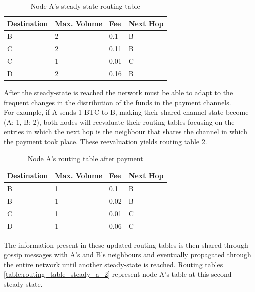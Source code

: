 \begin{table}[H]
\centering
\begin{tabular}{|l|l|l|l|}
\hline
\rowcolor[HTML]{C0C0C0} 
Destination & Max. Volume   & Fee   & Next Hop \\ \hline
B           & 2             & 0.1   & B       \\ \hline
C           & 2             & 0.11  & B       \\ \hline
C           & 1             & 0.01  & C       \\ \hline
D           & 2             & 0.16  & B       \\ \hline
\end{tabular}
\caption{Node A's steady-state routing table}
\label{table:routing_table_steady_a}
\end{table}

After the steady-state is reached the network must be able to adapt to the frequent changes in the distribution of the funds in the payment channels.\\
For example, if A sends 1 BTC to B, making their shared channel state become (A: 1, B: 2), both nodes will reevaluate their routing tables focusing on the entries in which the next hop is the neighbour that shares the channel in which the payment took place. These reevaluation yields routing table \ref{table:routing_table_payment_a}.

\begin{table}[H]
\centering
\begin{tabular}{|l|l|l|l|}
\hline
\rowcolor[HTML]{C0C0C0} 
Destination & Max. Volume   & Fee   & Next Hop \\ \hline
B           & 1             & 0.1   & B       \\ \hline
B           & 1             & 0.02  & B         \\ \hline
C           & 1             & 0.01  & C       \\ \hline
D           & 1             & 0.06  & C       \\ \hline
\end{tabular}
\caption{Node A's routing table after payment}
\label{table:routing_table_payment_a}
\end{table}

The information present in these updated routing tables is then shared through gossip messages with A's and B's neighbours and eventually propagated through the entire network until another steady-state is reached. Routing tables \ref{table:routing_table_steady_a_2} represent node A's table at this second steady-state.

